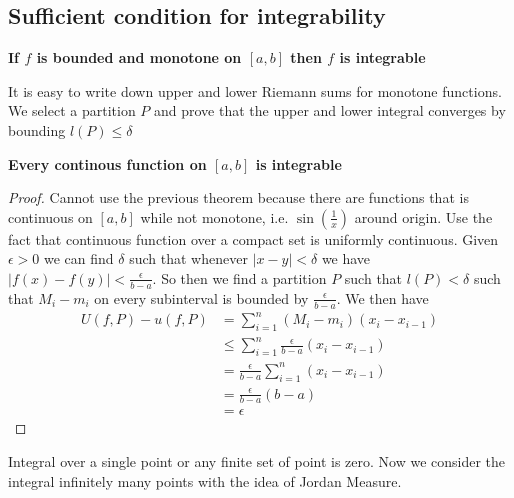 \documentclass[11pt]{article}
\begin{document}
\subsection*{Sufficient condition for integrability}

\begin{theorem*}
  \textbf{If $f$ is bounded and monotone on $[a,b]$ then $f$ is integrable}
  \begin{rem}
    It is easy to write down upper and lower Riemann sums for monotone functions. We select a partition $P$ and prove that the upper and lower integral converges by bounding $l(P) \leq \delta$
  \end{rem}
\end{theorem*}


\begin{theorem*}
  \textbf{Every continous function on $[a,b]$ is integrable}
  \begin{proof}
    Cannot use the previous theorem because there are functions that is continuous on $[a,b]$ while not monotone, i.e. $\sin (\frac{1}{x})$ around origin. Use the fact that continuous function over a compact set is uniformly continuous. Given $\epsilon >0$ we can find $\delta$ such that whenever $|x-y| < \delta$ we have $|f(x) - f(y)|<\frac{\epsilon}{b-a}$. So then we find a partition $P$ such that $l(P) < \delta$ such that $M_i - m_i$ on every subinterval is bounded by $\frac{\epsilon}{b-a}$. We then have
    \begin{align*}
        U(f,P) - u(f,P) &= \sum_{i=1}^n (M_i - m_i)(x_i - x_{i-1}) \\
        &\leq  \sum_{i=1}^n \frac{\epsilon}{b-a}(x_i - x_{i-1}) \\
        &=  \frac{\epsilon}{b-a} \sum_{i=1}^n (x_i - x_{i-1}) \\
        &= \frac{\epsilon}{b-a} (b-a) \\
        &= \epsilon
    \end{align*}
  \end{proof}
\end{theorem*}


Integral over a single point or any finite set of point is zero. Now we consider the integral infinitely many points with the idea of Jordan Measure.
\end{document}
